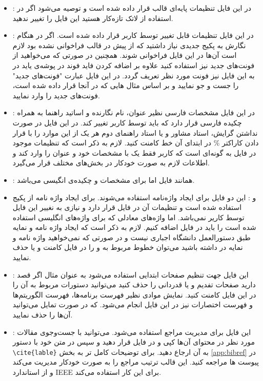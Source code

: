\begin{itemize}
	\item {}: 
	در این فایل تنظیمات پایه‌ای قالب قرار داده شده است 
	و توصیه می‌شود اگر در استفاده از لاتک تازه‌کار هستید
	این فایل را تغییر ندهید.
	\item {}:
	در این فایل تنظیمات قابل تغییر توسط کاربر قرار داده شده است.
	اگر در هنگام نگارش به پکیج جدیدی نیاز داشتید که از پیش در قالب
	فراخوانی نشده بود لازم است آن‌ها در این فایل فراخوانی شوند. همچنین 
	در صورتی که می‌خواهید از فونت‌های جدید نیز  استفاده کنید علاوه بر اضافه
	کردن فاید فوند در پوشه‌ی
	یاید در به این فایل نیز فونت مورد نظر تعریف گردد. در این فایل عبارت 
	"فونت‌های جدید" را جست و جو نمایید و بر اساس مثال هایی که در آنجا قرار
	داده شده است، فونت‌های جدید را وارد نمایید.
	\item {}:
	در این فایل مشخصات فارسی نظیر عنوان، نام نگارنده و 
	اساتید راهنما به همراه چکیده فارسی قرار دارد 
	که باید توسط کاربر تغییر کند. در این فایل در صورت
	نداشتن گرایش، استاد مشاور و یا استاد راهنمای دوم هر
	یک از این موارد را با قرار دادن کاراکتر
	\%
	در ابتدای آن خط کامنت کنید. لازم به ذکر است که تنظیمات
	موجود در فایل
	به گونه‌ای است که کاربر فقط یک با مشخصات خود و عنوان
	را وارد کند و اطلاعات لازم به صورت خودکار در بخش‌های 
	مختلف قرار می‌گیرد. 
	\item {}:
	همانند فایل
	اما برای مشخصات و چکیده‌ی انگیسی می‌باشد.
	\item {}
	و
	:
	این دو فایل برای ایجاد واژه‌نامه استفاده می‌شوند.
	برای ایجاد واژه نامه از پکیج 
	استفاده شده است و	تنظیمات آن در فایل
	قرار دارد و نیازی به نغییر این فایل توسط کاریر نمی‌باشد.
	اما واژه‌های معادلی که برای واژه‌های انگلیسی استفاده شده
	است را باید در فایل  
	اضافه کنیم. لازم به ذکر است که ایجاد واژه نامه و نمایه 
	طبق دستورالعمل دانشگاه اجباری نیست و در صورتی که نمی‌خواهید
	واژه نامه و نمایه در \پ داشته باشید می‌توان خطوط مربوط به 
	و
	را
	در فایل 
	کامنت و یا حذف نمایید.
	\item {}:
	این فایل جهت تنظیم صفحات ابتدایی استفاده می‌شود به
	عنوان مثال اگر	قصد دارید صفحات تفدیم و یا قدردانی
	را حذف کنید می‌توانید دستورات	مربوط به آن را در این
	فایل کامنت کنید. نمایش موادی نظیر فهرست برنامه‌ها، 
	فهرست الگوریتم‌ها و فهرست اختصارات نیز در این فایل
	انجام می‌شود. که در صورت تمایل می‌توانید آن‌ها را حذف
	نمایید.
	\item {}:
	این فایل برای مدیریت مراجع استفاده می‌شود. می‌توانید
	با جست‌و‌جوی مقالات مورد نظر در 
	محتوای
	آن‌ها کپی و در فایل
	قرار دهید و سپس در متن خود با دستور
	\verb*|\cite{lable}|
	به آن ارجاع دهید. برای توضیحات کامل تر به بخش
	\ref{app:bibref}
	در پیوست ها مراجعه کنید.
	این قالب ترتیب مراجع را به
	صورت خودکار مدیریت می‌کند و از استاندارد ‌IEEE 
	برای این کار استفاده می‌کند.
	

\end{itemize}
